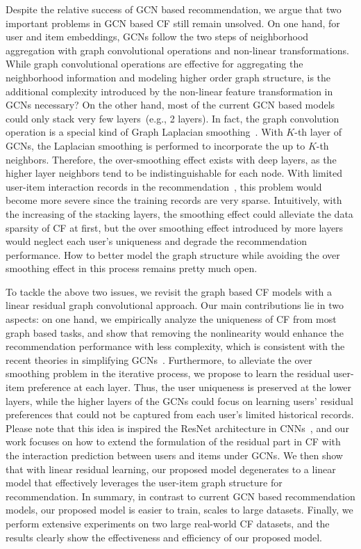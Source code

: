 \documentclass[letterpaper]{article} %
\begin{document}
Despite the relative success of GCN based recommendation, we argue that two important problems in GCN based CF still remain unsolved. On one hand, for user and item embeddings, GCNs follow the two steps of neighborhood aggregation with graph convolutional operations and non-linear transformations. While graph convolutional operations are effective for aggregating the neighborhood information and modeling higher order graph structure, is the additional complexity introduced by the non-linear feature transformation in GCNs necessary? On the other hand, most of the current GCN based models could only stack very few layers~(e.g., 2 layers).  In fact, the graph convolution operation is a special kind of Graph Laplacian smoothing~\cite{li2018deeper,klicpera2018predict}. With $K$-th layer of GCNs, the Laplacian smoothing is performed to incorporate the up to $K$-th neighbors. Therefore, the over-smoothing effect exists with deep layers, as the higher layer neighbors tend to be indistinguishable for each node. With limited user-item interaction records in the recommendation~\cite{wu2017modeling,wu2016relevance}, this problem would become more severe since the training records are very sparse. Intuitively, with the increasing of the stacking layers, the smoothing effect could alleviate the data sparsity of CF at first, but the over smoothing effect introduced by more layers would neglect each user's uniqueness and degrade the recommendation performance. How to better model the graph structure while avoiding the over smoothing effect in this process remains pretty much open.



To tackle the above two issues, we revisit the graph based CF models with a linear residual graph convolutional approach. Our main contributions lie in two aspects: on one hand, we empirically analyze the uniqueness of CF from most graph based tasks, and show that removing the nonlinearity would enhance the recommendation performance with less complexity, which is consistent with the recent theories in simplifying GCNs~\cite{ICML2019simplifying}. Furthermore, to alleviate the over smoothing problem in the iterative process, we propose to learn the residual user-item preference at each layer. Thus, the user uniqueness is preserved at the lower layers, while the higher layers of the GCNs could focus on learning users' residual preferences that could not be captured from each user's limited historical records. Please note that this idea is inspired the ResNet architecture in CNNs~\cite{CVPR2016resudial,wu2019wider}, and our work focuses on how to extend the formulation of the residual part in CF with the interaction prediction between users and items under GCNs. We then show that with linear residual learning, our proposed model degenerates to a linear model that effectively leverages the user-item graph structure for recommendation. In summary, in contrast to current GCN based recommendation models, our proposed model is easier to train, scales to large datasets. Finally, we perform extensive experiments on two large real-world CF datasets, and the results clearly show the effectiveness and efficiency of our proposed model.
\end{document}
